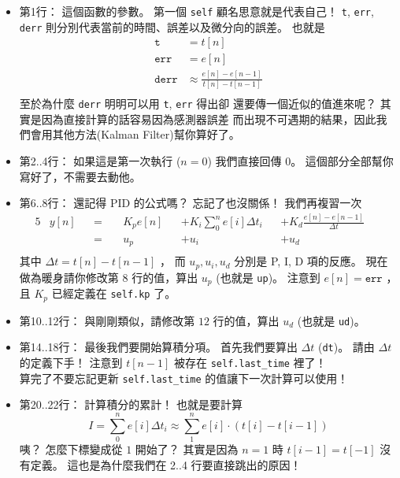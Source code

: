 \documentclass[12pt, a4paper]{article}
\begin{document}
\begin{itemize}
  \itemsep=0pt
  \item 第1行： 這個函數的參數。 第一個 \texttt{self} 
    顧名思意就是代表自己！ \texttt{t}, \texttt{err}, \texttt{derr}
    則分別代表當前的時間、誤差以及微分向的誤差。 也就是
    \begin{align*}
      \texttt{t} &= t[n] \\
      \texttt{err} &= e[n] \\
      \texttt{derr} &\approx \frac{e[n] - e[n-1]}{t[n] - t[n-1]} \\
    \end{align*}
    至於為什麼 \texttt{derr} 明明可以用 \texttt{t}, \texttt{err} 得出卻
    還要傳一個近似的值進來呢？ 其實是因為直接計算的話容易因為感測器誤差
    而出現不可遇期的結果，因此我們會用其他方法(Kalman Filter)幫你算好了。

  \item 第2..4行： 如果這是第一次執行 ($n = 0$) 我們直接回傳 $0$。
    這個部分全部幫你寫好了，不需要去動他。

  \item 第6..8行：
    還記得 PID 的公式嗎？ 忘記了也沒關係！ 我們再複習一次
    \begin{alignat*}{5}
      & y[n] &&= \;&&K_p e[n] &&+ K_i \sum_0^{n} e[i] \Delta t_i&&+ K_d \frac{e[n] - e[n-1]}{\Delta t} &&\\
      &    &&= \;&&u_p        &&+ u_i                         &&+ u_d &&\\
    \end{alignat*}
    其中 $\Delta t = t[n] - t[n-1]$ ， 而 $u_p, u_i, u_d$ 分別是 P, I, D 項的反應。
    現在做為暖身請你修改第 $8$ 行的值，算出 $u_p$ (也就是 \texttt{up})。
    注意到 $e[n] = \texttt{err}$ ， 且 $K_p$ 已經定義在 \texttt{self.kp} 了。

  \item 第10..12行：
    與剛剛類似，請修改第 $12$ 行的值，算出 $u_d$ (也就是 \texttt{ud})。

  \item 第14..18行：
    最後我們要開始算積分項。 首先我們要算出 $\Delta t$ (\texttt{dt})。
    請由 $\Delta t$ 的定義下手！ 注意到 $t[n-1]$ 被存在 \texttt{self.last_time}
    裡了！\\
    算完了不要忘記更新 \texttt{self.last_time} 的值讓下一次計算可以使用！

  \item 第20..22行：
    計算積分的累計！ 也就是要計算
    \[ I = \sum_0^n e[i] \Delta t_i \approx \sum_1^n e[i] \cdot (t[i] - t[i-1]) \]
    咦？ 怎麼下標變成從 $1$ 開始了？ 其實是因為 $n = 1$ 時 $t[i-1] = t[-1]$ 
    沒有定義。 這也是為什麼我們在 2..4 行要直接跳出的原因！


\end{itemize}
\end{document}
